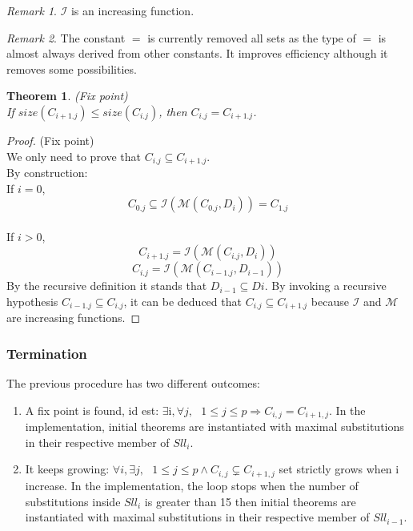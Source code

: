 \documentclass[a4paper, 11pt]{article}
\theoremstyle{plain}
\newtheorem*{thm}{Theorem}
\theoremstyle{definition}
\theoremstyle{remark}
\newtheorem*{remark}{Remark}
\begin{document}
\begin{remark}
$\mathcal{I}$ is an increasing function.
\end{remark}
\begin{remark}
The constant $=$ is currently removed all sets as the type of $=$ is almost always derived from other constants. It improves efficiency although it removes some possibilities.
\end{remark}   

\begin{thm} (Fix point)
\\If $size(C_{i+1.j}) \leq size(C_{i.j})$, then $C_{i.j} = C_{i+1.j}$.
\end{thm}

\begin{proof} (Fix point)
\\We only need to prove that $C_{i.j} \subseteq C_{i+1.j}$.
\\By construction:
\\If $i = 0$, 
\[ C_{0.j} \subseteq \mathcal{I} (\mathcal{M} (C_{0.j},D_i)) = C_{1.j} \] 
\\If $i > 0$,
\[C_{i+1.j} = \mathcal{I} (\mathcal{M} (C_{i.j},D_i)) \]
\[C_{i.j} = \mathcal{I} (\mathcal{M} (C_{i-1.j},D_{i-1})) \]
By the recursive definition it stands that $D_{i-1} \subseteq D{i}$. By invoking a recursive hypothesis $C_{i-1.j} \subseteq C_{i.j}$, it can be deduced that $C_{i.j} \subseteq C_{i+1.j}$ because $\mathcal{I}$ and $\mathcal{M}$ are increasing functions.
\end{proof}


\subsubsection{Termination}
The previous procedure has two different outcomes:
\begin{enumerate}
\item A fix point is found, id est: $\exists $i$, \forall j,\mbox{ }
1 \leq j \leq p \Rightarrow C_{i,j} = C_{i+1,j}$. In the implementation, initial theorems are instantiated with maximal substitutions in their respective member of $Sll_{i}$.
\item It keeps growing: $\forall i, \exists j,\mbox{ } 1 \leq j \leq p \wedge C_{i,j} \subsetneq C_{i+1,j}$ set strictly grows when i increase. In the implementation, the loop stops when the number of substitutions inside $Sll_{i}$ is greater than 15 then initial theorems are instantiated with maximal substitutions in their respective member of $Sll_{i-1}$.
\end{enumerate} 
\end{document}
